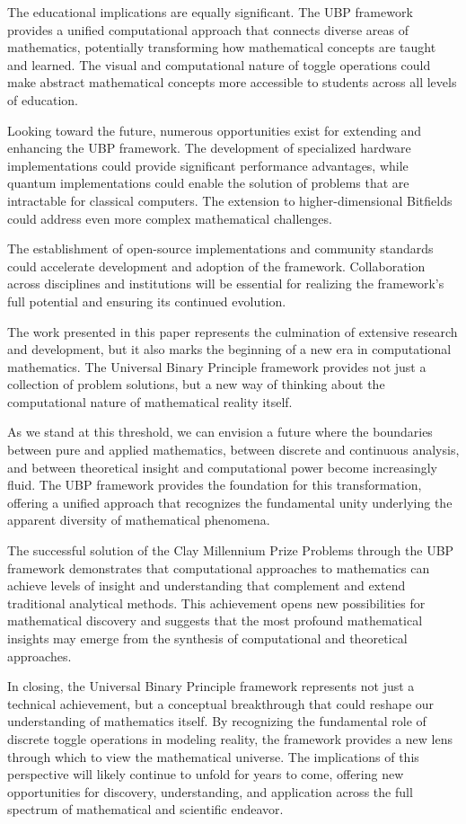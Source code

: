 \documentclass[11pt]{amsart}
\begin{document}
The educational implications are equally significant. The UBP framework provides a unified computational approach that connects diverse areas of mathematics, potentially transforming how mathematical concepts are taught and learned. The visual and computational nature of toggle operations could make abstract mathematical concepts more accessible to students across all levels of education.

Looking toward the future, numerous opportunities exist for extending and enhancing the UBP framework. The development of specialized hardware implementations could provide significant performance advantages, while quantum implementations could enable the solution of problems that are intractable for classical computers. The extension to higher-dimensional Bitfields could address even more complex mathematical challenges.

The establishment of open-source implementations and community standards could accelerate development and adoption of the framework. Collaboration across disciplines and institutions will be essential for realizing the framework's full potential and ensuring its continued evolution.

The work presented in this paper represents the culmination of extensive research and development, but it also marks the beginning of a new era in computational mathematics. The Universal Binary Principle framework provides not just a collection of problem solutions, but a new way of thinking about the computational nature of mathematical reality itself.

As we stand at this threshold, we can envision a future where the boundaries between pure and applied mathematics, between discrete and continuous analysis, and between theoretical insight and computational power become increasingly fluid. The UBP framework provides the foundation for this transformation, offering a unified approach that recognizes the fundamental unity underlying the apparent diversity of mathematical phenomena.

The successful solution of the Clay Millennium Prize Problems through the UBP framework demonstrates that computational approaches to mathematics can achieve levels of insight and understanding that complement and extend traditional analytical methods. This achievement opens new possibilities for mathematical discovery and suggests that the most profound mathematical insights may emerge from the synthesis of computational and theoretical approaches.

In closing, the Universal Binary Principle framework represents not just a technical achievement, but a conceptual breakthrough that could reshape our understanding of mathematics itself. By recognizing the fundamental role of discrete toggle operations in modeling reality, the framework provides a new lens through which to view the mathematical universe. The implications of this perspective will likely continue to unfold for years to come, offering new opportunities for discovery, understanding, and application across the full spectrum of mathematical and scientific endeavor.
\end{document}
